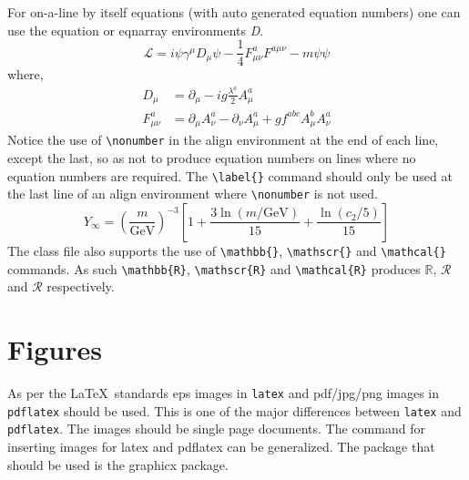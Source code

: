 \documentclass[journal=gmj]{CUP-JNL-DTM}%
\theoremstyle{definition}
\numberwithin{equation}{section}
\begin{document}
For on-a-line by itself equations (with auto generated equation numbers)
one can use the equation or eqnarray environments \textit{D}.
\begin{equation}
\mathcal{L} = i {\psi} \gamma^\mu D_\mu \psi
    - \frac{1}{4} F_{\mu\nu}^a F^{a\mu\nu} - m {\psi} \psi
\label{eq1}
\end{equation}
where,
\begin{align}
D_\mu &=  \partial_\mu - ig \frac{\lambda^a}{2} A^a_\mu
\nonumber \\
F^a_{\mu\nu} &= \partial_\mu A^a_\nu - \partial_\nu A^a_\mu
    + g f^{abc} A^b_\mu A^a_\nu
\label{eq2}
\end{align}
Notice the use of \verb+\nonumber+ in the align environment at the end
of each line, except the last, so as not to produce equation numbers on
lines where no equation numbers are required. The \verb+\label{}+ command
should only be used at the last line of an align environment where
\verb+\nonumber+ is not used.
\begin{equation}
Y_\infty = \left( \frac{m}{\textrm{GeV}} \right)^{-3}
    \left[ 1 + \frac{3 \ln(m/\textrm{GeV})}{15}
    + \frac{\ln(c_2/5)}{15} \right]
\end{equation}
The class file also supports the use of \verb+\mathbb{}+, \verb+\mathscr{}+ and
\verb+\mathcal{}+ commands. As such \verb+\mathbb{R}+, \verb+\mathscr{R}+
and \verb+\mathcal{R}+ produces $\mathbb{R}$, $\mathscr{R}$ and $\mathcal{R}$
respectively.

\section{Figures}

As per the \LaTeX\ standards eps images in \verb!latex! and pdf/jpg/png images in
\verb!pdflatex! should be used. This is one of the major differences between \verb!latex!
and \verb!pdflatex!. The images should be single page documents. The command for inserting images
for latex and pdflatex can be generalized. The package that should be used
is the graphicx package.
\end{document}
